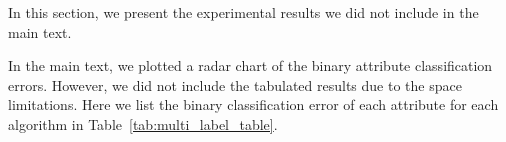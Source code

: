 
In this section, we present the experimental results we did not include in the main text. %

\label{sec:multi_label_error}
In the main text, we plotted a radar chart of the binary attribute classification errors. However, we did not include the tabulated results due to the space limitations. Here we list the binary classification error of each attribute for each algorithm in Table~\ref{tab:multi_label_table}.


